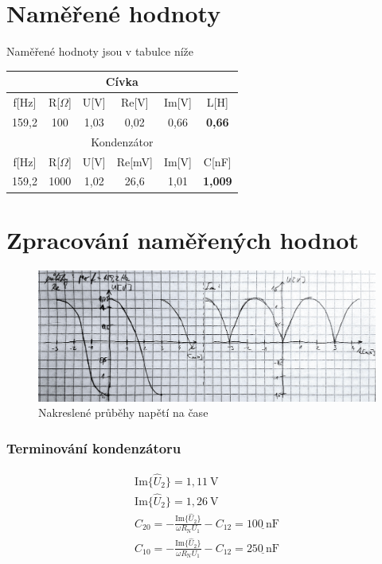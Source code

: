 \documentclass[a4paper,12pt]{article}   %
\newcommand{\tohm}{$\Omega$}
\begin{document}
\section{Naměřené hodnoty}
\label{chap:namerene_hodnoty}
Naměřené hodnoty jsou v tabulce níže

\begin{table}[h!]
  \centering
  \begin{tabular}{|c|c|c|c|c||c|}
    \hline
    \multicolumn{6}{|c|}{Cívka}       \\ \hline
    f[Hz]     & R[\tohm]    & U[V]    & Re[V]   & Im[V] & L[H]  \\ \hline
    159,2 & 100  & 1,03    & 0,02 & 0,66 & \textbf{0,66} \\ \hline\hline
    \multicolumn{6}{|c|}{Kondenzátor} \\ \hline
    f[Hz]     & R[\tohm]    & U[V]    & Re[mV]   & Im[V] & C[nF]  \\ \hline
    159,2 & 1000 & 1,02 & 26,6 & 1,01 & \textbf{1,009}\\ \hline
  \end{tabular}
\end{table}



\section{Zpracování naměřených hodnot}
\label{chap:zpracovani_hodnot}
\begin{figure}[h!]
  \centering
  \includegraphics[width=\textwidth]{prubeh.jpg}
  \caption{Nakreslené průběhy napětí na čase}
\end{figure}

\subsubsection{Terminování kondenzátoru}
\begin{equation}
  \begin{split}
    \text{Im}\{\hat{U}_\text{2}\} = 1,11~\text{V}\\
    \text{Im}\{\hat{U}_\text{2}\} = 1,26~\text{V}\\
    C_{20} = -\frac{\text{Im}\{\hat{U}_\text{2}\}}{\omega R_\text{N}U_\text{1}}-C_\text{12} = \underline{100~\text{nF}}\\
    C_{10} = -\frac{\text{Im}\{\hat{U}_\text{2}\}}{\omega R_\text{N}U_\text{1}}-C_\text{12} = \underline{250~\text{nF}}\\
  \end{split}
\end{equation}
\end{document}
